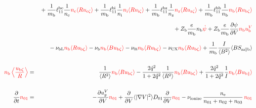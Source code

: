 \documentclass[11pt]{article}
\def\r#1{{\rm#1}}
\def\ave#1{\left\langle#1\right\rangle}
\def\aves#1{\langle#1\rangle}
\def\dd#1#2{\frac{\partial #1}{\partial #2}}
\def\para{\parallel}
\def\ddV{\frac{\partial}{\partial V}}
\def\ddt{\frac{\partial}{\partial t}}
\def\mi{m_\r{i}}
\def\mb{m_\r{b}}
\def\nee{n_\r{e}}
\def\ni{n_\r{i}}
\def\nz{n_\r{z}}
\def\nb{n_\r{b}}
\def\Te{T_\r{e}}
\def\Zi{Z_\r{i}}
\def\Zb{Z_\r{b}}
\def\uzt#1{u_{\r{#1}\zeta}}
\def\upara#1{u_{\r{#1}\para}}
\def\qhatpara#1{\hat{q}_{\r{#1}\para}}
\def\uV#1{u_\r{#1}^V}
\def\ugV{u_{g}^V}
\def\chis#1{\chi_\r{#1}}
\def\De{D_\r{e}}
\def\nun#1{\nu_\r{0#1}}
\def\bri{\aves{B^2}\aves{R^2} - I^2}
\def\nna{n_{01}}
\def\nnb{n_{02}}
\def\nnc{n_{03}}
\def\nuCX{\nu_\r{CX}}
\def\nuion{\nu_\r{ionize}}
\def\nub{\nu_\r{b}}
\def\nuOL{\nu_\r{OL}}
\def\nubL{\nu_\r{bL}}
\def\red#1{\textcolor{red}{#1}}
\begin{document}
\begin{eqnarray}
\nonumber\\[2.5mm]&&{}
%
  + \frac{1}{\mb} \ell_{11}^\r{be} \frac{1}{\nee} \red{\nee \aves{R \uzt{e}}}
  + \frac{1}{\mb} \ell_{11}^\r{bi} \frac{1}{\ni}  \red{\ni  \aves{R \uzt{i}}}
  + \frac{1}{\mb} \ell_{11}^\r{bz} \frac{1}{\nz}  \red{\nz  \aves{R \uzt{z}}}
  + \frac{1}{\mb} \ell_{11}^\r{bb} \frac{1}{\nb}  \red{\nb  \aves{R \uzt{b}}}
\nonumber\\[2.5mm]&&{}
%
%
  + \Zb \frac{e}{\mb}              \nb \red{\dot{\psi}}
%
  + \Zb \frac{e}{\mb} \dd{\psi}{V} \red{\nb \uV{b}}
%
\nonumber\\[2.5mm]&&{}
%
  - \nubL  \red{\nb \aves{R \uzt{b}}}
%
  - \nub  \red{\nb \aves{B \uzt{b}}}
%
  - \nun{i} \red{\nb \aves{R \uzt{b}}}
%
  - \nuCX \red{\nb \aves{R \uzt{b}}}
%
%
  + \frac{1}{\mb} \frac{I}{\aves{B^2}} \aves{B S_{\r{m}\para\r{b}}}
%
\\[5mm]
    \red{\nb \ave{\frac{\uzt{b}}{R}}} &=&
%
    \frac{1}{\aves{R^2}} \red{\nb \aves{R\uzt{b}}}
%
  - \frac{2\hat{q}^2}{1+2\hat{q}^2} \frac{1}{\aves{R^2}}\red{\nb\aves{R\uzt{b}}}
%
  + \frac{2\hat{q}^2}{1+2\hat{q}^2} \frac{1}{I}\red{\nb \aves{B\upara{b}}}
\\[5mm]
  \ddt \red{\nna} &=& 
%
  - \dd{\ugV}{V} \red{\nna}
%
  + \ddV \aves{|\nabla V|^2} D_{01} \ddV \red{\nna}
%
  - \nuion\, \frac{\nee}{\nna + \nnb + \nnc}\, \red{\nna}
%
\nonumber\\[2.5mm]&&{}

\end{eqnarray}
\end{document}
